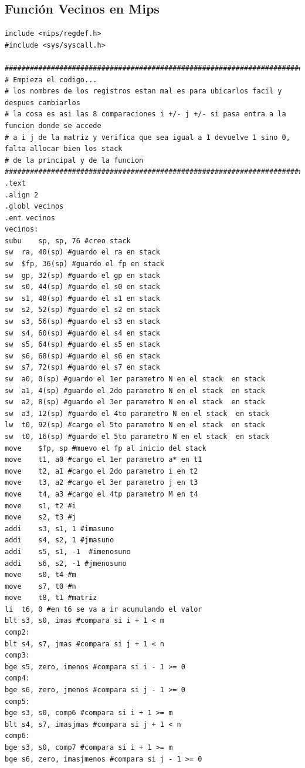 \documentclass[11pt,a4paper]{article}
\begin{document}
\subsection{Función Vecinos en Mips}

\begin{lstlisting}[caption={vecinos.s},label={lst:codigoc}]
include <mips/regdef.h>
#include <sys/syscall.h>

######################################################################################
# Empieza el codigo...
# los nombres de los registros estan mal es para ubicarlos facil y despues cambiarlos
# la cosa es asi las 8 comparaciones i +/- j +/- si pasa entra a la funcion donde se accede
# a i j de la matriz y verifica que sea igual a 1 devuelve 1 sino 0, falta allocar bien los stack
# de la principal y de la funcion
######################################################################################
.text
.align 2
.globl vecinos
.ent vecinos
vecinos:
subu	sp, sp, 76 #creo stack
sw	ra, 40(sp) #guardo el ra en stack
sw	$fp, 36(sp)	#guardo el fp en stack
sw	gp, 32(sp) #guardo el gp en stack
sw	s0, 44(sp) #guardo el s0 en stack
sw	s1, 48(sp) #guardo el s1 en stack
sw	s2, 52(sp) #guardo el s2 en stack
sw	s3, 56(sp) #guardo el s3 en stack
sw	s4, 60(sp) #guardo el s4 en stack
sw	s5, 64(sp) #guardo el s5 en stack
sw	s6, 68(sp) #guardo el s6 en stack
sw	s7, 72(sp) #guardo el s7 en stack
sw	a0, 0(sp) #guardo el 1er parametro N en el stack  en stack
sw	a1, 4(sp) #guardo el 2do parametro N en el stack  en stack
sw	a2, 8(sp) #guardo el 3er parametro N en el stack  en stack
sw	a3, 12(sp) #guardo el 4to parametro N en el stack  en stack
lw	t0, 92(sp) #cargo el 5to parametro N en el stack  en stack
sw	t0, 16(sp) #guardo el 5to parametro N en el stack  en stack
move	$fp, sp #muevo el fp al inicio del stack
move	t1, a0 #cargo el 1er parametro a* en t1 
move	t2, a1 #cargo el 2do parametro i en t2
move	t3, a2 #cargo el 3er parametro j en t3
move	t4, a3 #cargo el 4tp parametro M en t4
move	s1, t2 #i
move	s2, t3 #j
addi	s3, s1, 1 #imasuno
addi	s4, s2, 1 #jmasuno
addi	s5, s1, -1	#imenosuno
addi	s6, s2, -1 #jmenosuno
move	s0, t4 #m
move	s7, t0 #n
move	t8, t1 #matriz
li	t6, 0 #en t6 se va a ir acumulando el valor
blt	s3, s0, imas #compara si i + 1 < m 
comp2:
blt	s4, s7, jmas #compara si j + 1 < n 
comp3:
bge	s5, zero, imenos #compara si i - 1 >= 0 
comp4:
bge	s6, zero, jmenos #compara si j - 1 >= 0
comp5:
bge	s3, s0, comp6 #compara si i + 1 >= m
blt	s4, s7, imasjmas #compara si j + 1 < n
comp6:
bge	s3, s0, comp7 #compara si i + 1 >= m
bge	s6, zero, imasjmenos #compara si j - 1 >= 0 

\end{lstlisting}
\end{document}
